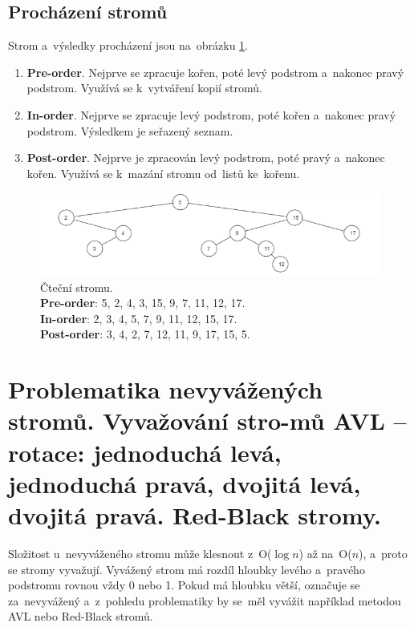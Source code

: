 \subsection{Procházení stromů}

Strom a~výsledky procházení jsou na~obrázku \ref{tree}.

\begin{enumerate}
	\item \textbf{Pre-order}. Nejprve se zpracuje kořen, poté levý podstrom a~nakonec pravý podstrom. Využívá se k~vytváření kopií stromů.
	\item \textbf{In-order}. Nejprve se zpracuje levý podstrom, poté kořen a~nakonec pravý podstrom. Výsledkem je seřazený seznam.
	\item \textbf{Post-order}. Nejprve je zpracován levý podstrom, poté pravý a~nakonec kořen. Využívá se k~mazání stromu od~listů ke~kořenu.
\end{enumerate}

\begin{figure}[ht]
	\centering
	\includegraphics[scale=1]{images/tree.PNG}
	\caption{
		Čteční stromu. \\
		\textbf{Pre-order}: 5, 2, 4, 3, 15, 9, 7, 11, 12, 17. \\
		\textbf{In-order}: 2, 3, 4, 5, 7, 9, 11, 12, 15, 17. \\
		\textbf{Post-order}: 3, 4, 2, 7, 12, 11, 9, 17, 15, 5. \\
	}
	\label{tree}
\end{figure}

\clearpage
\section[Problematika nevyvážených stromů. Vyvažování stromů AVL - rotace: jednoduchá levá, jednoduchá pravá, dvojitá levá, dvojitá pravá. Red-Black stromy]{Problematika nevyvážených stromů. Vyvažování stro-mů AVL -- rotace: jednoduchá levá, jednoduchá pravá, dvojitá levá, dvojitá pravá. Red-Black stromy.
 }

Složitost u~nevyváženého stromu může klesnout z~O(\( \log{n} \)) až na~O(\( n \)), a~proto se stromy vyvažují. Vyvážený strom má rozdíl hloubky levého a~pravého podstromu rovnou vždy 0 nebo 1. Pokud má hloubku větší, označuje se za~nevyvážený a~z~pohledu problematiky by se~měl vyvážit například metodou AVL nebo Red-Black stromů.


